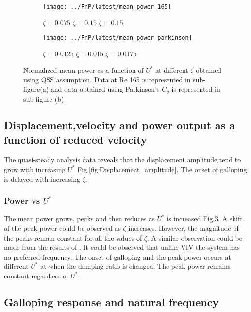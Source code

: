 \begin{figure}[h!]
\begin{subfigure}[b]{0.5\textwidth}
\centering
\label{fig:mean_power_165}
\texttt{[image: ../FnP/latest/mean\_power\_165]}
\caption{\scriptsize {} $\zeta=0.075$  $\zeta=0.15$  $\zeta=0.15$}
\end{subfigure}
\begin{subfigure}[b]{0.5\textwidth}
\centering
\label{fig:mean_power_parkinson}
\texttt{[image: ../FnP/latest/mean\_power\_parkinson]}
\caption{\scriptsize {} $\zeta=0.0125$  $\zeta=0.015$  $\zeta=0.0175$}
\end{subfigure}
\caption{Normalized mean power  as a function of $U^*$ at different $\zeta$ obtained using QSS assumption. Data at Re 165 is represented in sub-figure(a) and data obtained using Parkinson's  $C_y$ is represented in sub-figure (b)}
\label{fig:mean_power}
\end{figure}

      



\subsection{Displacement,velocity and power output as a function of reduced velocity}


 The quasi-steady analysis data reveals that the displacement amplitude tend to grow with increasing $U^*$ Fig.\ref{fig:Displacement_amplitude}. The onset of galloping is delayed with increasing $\zeta$. 
 
 \subsubsection*{Power vs $U^*$}
 
 The mean power grows, peaks and then reduces as $U^*$ is increased Fig.\ref{fig:mean_power}. A shift of the peak power could be observed as $\zeta$ increases. However, the magnitude of the peaks remain constant for all the values of $\zeta$. A similar observation could be made from the results of \cite{Barrero-Gil2010a}. It could be observed that unlike VIV the  system has no preferred frequency. The onset of galloping and the peak power occurs at different $U^*$ at when the damping ratio is changed. The peak power remains constant regardless of $U^*$.
 
 \subsection{Galloping response and natural frequency}
 
